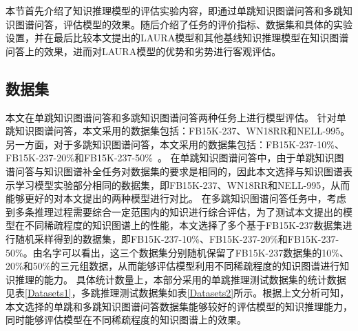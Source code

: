 \documentclass[algorithmlist, AutoFakeBold, AutoFakeSlant, figurelist, tablelist, nomlist, engineering]{seuthesix}
\begin{document}
本节首先介绍了知识推理模型的评估实验内容，即通过单跳知识图谱问答和多跳知识图谱问答，评估模型的效果。随后介绍了任务的评价指标、数据集和具体的实验设置，并在最后比较本文提出的LAURA模型和其他基线知识推理模型在知识图谱问答上的效果，进而对LAURA模型的优势和劣势进行客观评估。

\subsection{数据集}
本文在单跳知识图谱问答和多跳知识图谱问答两种任务上进行模型评估。
针对单跳知识图谱问答，本文采用的数据集包括：FB15K-237、WN18RR和NELL-995。
另一方面，对于多跳知识图谱问答，本文采用的数据集包括：FB15K-237-10\%、FB15K-237-20\%和FB15K-237-50\%~\cite{lv2020dynamic}。%
在单跳知识图谱问答中，由于单跳知识图谱问答与知识图谱补全任务对数据集的要求是相同的，因此本文选择与知识图谱表示学习模型实验部分相同的数据集，即FB15K-237、WN18RR和NELL-995，从而能够更好的对本文提出的两种模型进行对比。
在多跳知识图谱问答任务中，考虑到多条推理过程需要综合一定范围内的知识进行综合评估，为了测试本文提出的模型在不同稀疏程度的知识图谱上的性能，本文选择了多个基于FB15K-237数据集进行随机采样得到的数据集，即FB15K-237-10\%、FB15K-237-20\%和FB15K-237-50\%。由名字可以看出，这三个数据集分别随机保留了FB15K-237数据集的10\%、20\%和50\%的三元组数据，从而能够评估模型利用不同稀疏程度的知识图谱进行知识推理的能力。
具体统计数量上，本部分采用的单跳推理测试数据集的统计数据见表\ref{Datasets1}，多跳推理测试数据集如表\ref{Datasets2}所示。根据上文分析可知，本文选择的单跳和多跳知识图谱问答数据集能够较好的评估模型的知识推理能力，同时能够评估模型在不同稀疏程度的知识图谱上的效果。
\end{document}

